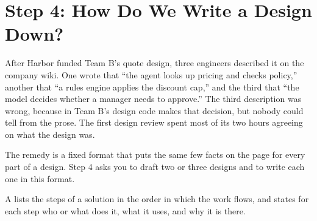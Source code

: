 
\section{Step 4: How Do We Write a Design Down?}
\label{sec:design-table}
\label{sec:notation}

\begin{inpractice}
After Harbor funded Team B's quote design, three engineers described it on the company wiki. One wrote that ``the agent looks up pricing and checks policy,'' another that ``a rules engine applies the discount cap,'' and the third that ``the model decides whether a manager needs to approve.'' The third description was wrong, because in Team B's design code makes that decision, but nobody could tell from the prose. The first design review spent most of its two hours agreeing on what the design was.
\end{inpractice}

The remedy is a fixed format that puts the same few facts on the page for every part of a design. Step 4 asks you to draft two or three designs and to write each one in this format.

\begin{definition}
A  lists the steps of a solution in the order in which the work flows, and states for each step who or what does it, what it uses, and why it is there.
\end{definition}

